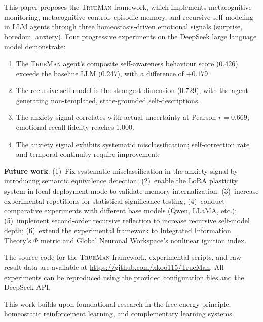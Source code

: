 \documentclass[pdflatex,sn-mathphys-num]{sn-jnl}
\newcommand{\TrueMan}{\textsc{TrueMan}}
\theoremstyle{thmstyleone}%
\theoremstyle{thmstyletwo}%
\theoremstyle{thmstylethree}%
\begin{document}
This paper proposes the \TrueMan{} framework, which implements metacognitive monitoring, metacognitive control, episodic memory, and recursive self-modeling in LLM agents through three homeostasis-driven emotional signals (surprise, boredom, anxiety). Four progressive experiments on the DeepSeek large language model demonstrate:

\begin{enumerate}[leftmargin=2em]
    \item The \TrueMan{} agent's composite self-awareness behaviour score (0.426) exceeds the baseline LLM (0.247), with a difference of $+0.179$.
    \item The recursive self-model is the strongest dimension (0.729), with the agent generating non-templated, state-grounded self-descriptions.
    \item The anxiety signal correlates with actual uncertainty at Pearson $r = 0.669$; emotional recall fidelity reaches 1.000.
    \item The anxiety signal exhibits systematic misclassification; self-correction rate and temporal continuity require improvement.
\end{enumerate}

\textbf{Future work}: (1)~Fix systematic misclassification in the anxiety signal by introducing semantic equivalence detection; (2)~enable the LoRA plasticity system in local deployment mode to validate memory internalization; (3)~increase experimental repetitions for statistical significance testing; (4)~conduct comparative experiments with different base models (Qwen, LLaMA, etc.); (5)~implement second-order recursive reflection to increase recursive self-model depth; (6)~extend the experimental framework to Integrated Information Theory's $\Phi$ metric and Global Neuronal Workspace's nonlinear ignition index.

\backmatter


The source code for the \TrueMan{} framework, experimental scripts, and raw result data are available at \url{https://github.com/xkoo115/TrueMan}. All experiments can be reproduced using the provided configuration files and the DeepSeek API.


This work builds upon foundational research in the free energy principle, homeostatic reinforcement learning, and complementary learning systems.
\end{document}
